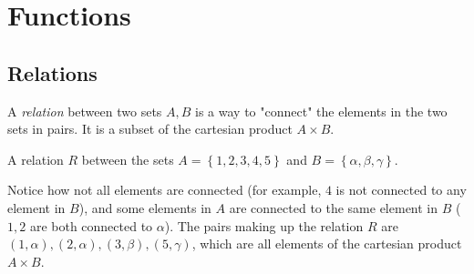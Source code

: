 \section{Functions}
\subsection{Relations}
A \emph{relation} between two sets $A,B$ is a way to "connect" the elements in the two sets in pairs. It is a subset of the cartesian product $A\times B$.
\begin{example}
  A relation $R$ between the sets $A=\left\{ 1,2,3,4,5 \right\}$ and $B=\left\{ \alpha,\beta,\gamma \right\}$. 
  \begin{figure}[H]
  \centering
  \end{figure}
  Notice how not all elements are connected (for example, $4$ is not connected to any element in $B$), and some elements in $A$ are connected to the same element in $B$ ($1,2$ are both connected to $\alpha$). The pairs making up the relation $R$ are $\left( 1,\alpha \right), \left( 2,\alpha \right), \left( 3,\beta \right), \left( 5,\gamma \right)$, which are all elements of the cartesian product $A\times B$.
\end{example}

